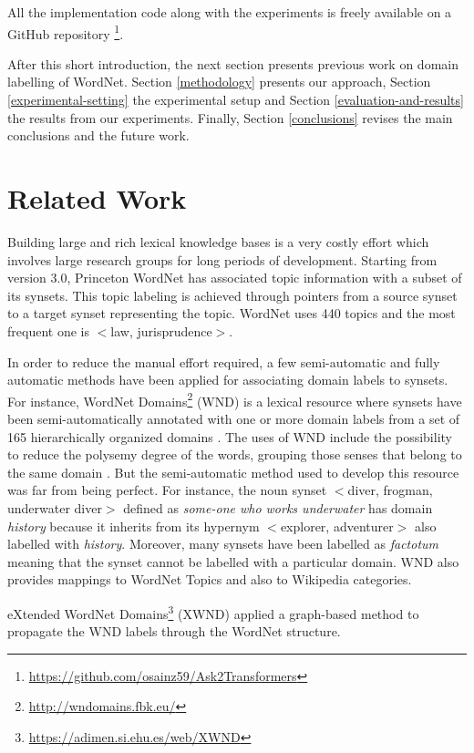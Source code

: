\documentclass[11pt]{article}
\begin{document}
All the implementation code along with the experiments is freely available on a GitHub repository \footnote{\url{https://github.com/osainz59/Ask2Transformers}}.

After this short introduction, the next section presents previous work on domain labelling of WordNet. Section \ref{methodology} presents our approach, Section \ref{experimental-setting} the experimental setup and Section \ref{evaluation-and-results} the results from our experiments. Finally, Section \ref{conclusions} revises the main conclusions and the future work.

\section{Related Work}
\label{related-work}

Building large and rich lexical knowledge bases is a very costly effort which involves large research groups for long periods of development. Starting from version 3.0, Princeton WordNet has associated topic information with a subset of its synsets. This topic labeling is achieved through pointers from a source synset to a target synset representing the topic. WordNet uses 440 topics and the most frequent one is $<$law, jurisprudence$>$. 

In order to reduce the manual effort required, a few semi-automatic and fully automatic methods have been applied for associating domain labels to synsets. For instance, WordNet Domains\footnote{\url{http://wndomains.fbk.eu/}} (WND) is a lexical resource where synsets have been semi-automatically annotated with one or more domain labels from a set of 165 hierarchically organized domains \cite{magnini2000g, bentivogli2004revising}. The uses of WND include the possibility to reduce the polysemy degree of the words, grouping those senses that belong to the same domain \cite{magnini2002role}. But the semi-automatic method used to develop this resource was far from being perfect. For instance, the noun synset $<$diver, frogman, underwater diver$>$ defined as {\it some-one who works underwater} has domain {\it history} because it inherits from its hypernym $<$explorer, adventurer$>$ also labelled with {\it history}. Moreover, many synsets have been labelled as {\it factotum} meaning that the synset cannot be labelled with a particular domain. WND also provides mappings to WordNet Topics and also to Wikipedia categories.

eXtended WordNet Domains\footnote{\url{https://adimen.si.ehu.es/web/XWND}} (XWND) \cite{gonzalez2012proposal,gonzalez2012graph} applied a graph-based method to propagate the WND labels through the WordNet structure.
\end{document}
